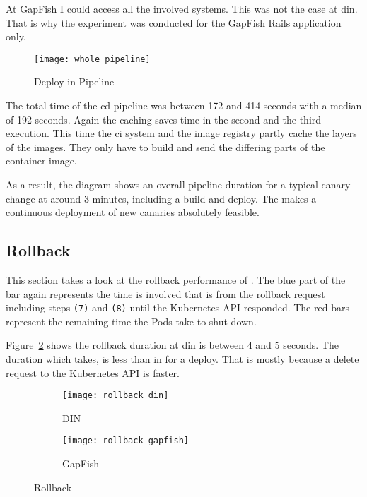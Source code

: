 At GapFish I could access all the involved systems. This was not the case at \gls{din}. That is
why the experiment was conducted for the GapFish Rails application only.

\begin{figure}[htbp]
  \centering
  \texttt{[image: whole\_pipeline]}
  \caption{Deploy in Pipeline}
  \label{fig:whole pipeline}
\end{figure}

The total time of the \gls{cd} pipeline was between 172 and 414 seconds with a median of
192 seconds. Again the caching saves time in the second and the third execution. This time
the \gls{ci} system and the image registry partly cache the layers of the images. They
only have to build and send the differing parts of the container image.

As a result, the diagram shows an overall pipeline duration for a typical canary change at around
3 minutes, including a build and deploy. The makes a continuous deployment of
new canaries absolutely feasible.

\subsection{Rollback}

This section takes a look at the rollback performance of \deployer{}. The blue part
of the bar again represents the time \deployer{} is involved that is from the rollback
request including steps \texttt{(7)} and \texttt{(8)} until the Kubernetes API responded. The red bars
represent the remaining time the Pods take to shut down.

Figure~\ref{fig:rollback_din} shows the rollback duration at \gls{din}
is between 4 and 5 seconds. The duration which \deployer{} takes, is less than in for a deploy.
That is mostly because a delete request to the Kubernetes API is faster.

\begin{figure}[htbp]
  \centering
  \begin{subfigure}{.5\textwidth}
    \texttt{[image: rollback\_din]}
    \caption{DIN}
    \label{fig:rollback_din}
  \end{subfigure}%
  \begin{subfigure}{.5\textwidth}
    \texttt{[image: rollback\_gapfish]}
    \caption{GapFish}
    \label{fig:rollback_gapfish}
  \end{subfigure}
  \caption{Rollback}
\end{figure}


